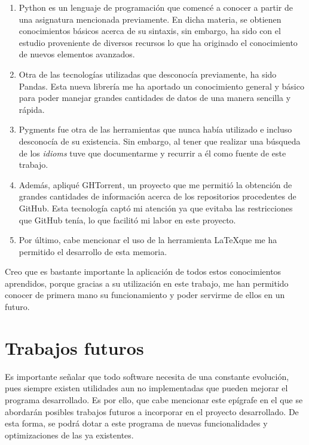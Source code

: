 \documentclass[a4paper, 12pt]{book}
\begin{document}
\begin{enumerate}
  \item Python es un lenguaje de programación que comencé a conocer a partir de una asignatura mencionada previamente. En dicha materia, se obtienen conocimientos básicos acerca de su sintaxis, sin embargo, ha sido con el estudio proveniente de diversos recursos lo que ha originado el conocimiento de nuevos elementos avanzados.
  
  \item Otra de las tecnologías utilizadas que desconocía previamente, ha sido Pandas. Esta nueva librería me ha aportado un conocimiento general y básico para poder manejar grandes cantidades de datos de una manera sencilla y rápida.

  \item Pygments fue otra de las herramientas que nunca había utilizado e incluso desconocía de su existencia. Sin embargo, al tener que realizar una búsqueda de los \textit{idioms} tuve que documentarme y recurrir a él como fuente de este trabajo.
  
  \item Además, apliqué GHTorrent, un proyecto que me permitió la obtención de grandes cantidades de información acerca de los repositorios procedentes de GitHub. Esta tecnología captó mi atención ya que evitaba las restricciones que GitHub tenía, lo que facilitó mi labor en este proyecto.
  
  \item Por último, cabe mencionar el uso de la herramienta \LaTeX que me ha permitido el desarrollo de esta memoria.
\end{enumerate}

Creo que es bastante importante la aplicación de todos estos conocimientos aprendidos, porque gracias a su utilización en este trabajo, me han permitido conocer de primera mano su funcionamiento y poder servirme de ellos en un futuro.


\section{Trabajos futuros}
\label{sec:trabajos_futuros}

Es importante señalar que todo software necesita de una constante evolución, pues siempre existen utilidades aun no implementadas que pueden mejorar el programa desarrollado. Es por ello, que cabe mencionar este epígrafe en el que se abordarán posibles trabajos futuros a incorporar en el proyecto desarrollado. De esta forma, se podrá dotar a este programa de nuevas funcionalidades y optimizaciones de las ya existentes.
\end{document}
